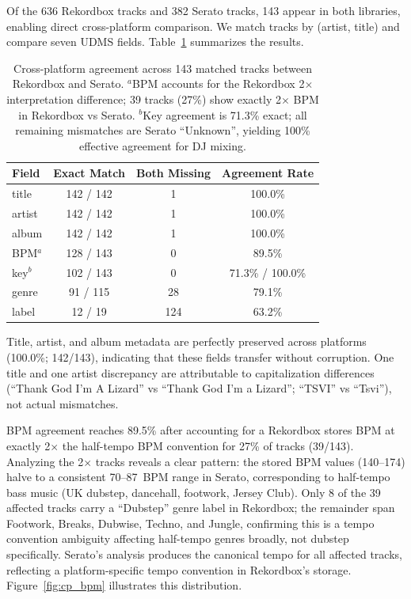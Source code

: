 \documentclass[letterpaper,10pt]{article}
\begin{document}
Of the 636 Rekordbox tracks and 382 Serato tracks, 143 appear in both libraries, enabling direct cross-platform comparison. We match tracks by (artist, title) and compare seven UDMS fields. Table~\ref{tab:cross-platform} summarizes the results.

\begin{table}[t]
  \centering
  \small
  \begin{tabular}{lccc}
    \toprule
    \textbf{Field} & \textbf{Exact Match} & \textbf{Both Missing} & \textbf{Agreement Rate} \\
    \midrule
    title        & 142 / 142 & 1  & 100.0\% \\
    artist       & 142 / 142 & 1  & 100.0\% \\
    album        & 142 / 142 & 1  & 100.0\% \\
    BPM$^a$      & 128 / 143 & 0  & 89.5\% \\
    key$^{b}$    & 102 / 143 & 0  & 71.3\% / 100.0\% \\
    genre        & 91 / 115  & 28 & 79.1\% \\
    label        & 12 / 19   & 124 & 63.2\% \\
    \bottomrule
  \end{tabular}
  \caption{Cross-platform agreement across 143 matched tracks between Rekordbox and Serato. $^{a}$BPM accounts for the Rekordbox 2$\times$ interpretation difference; 39 tracks (27\%) show exactly 2$\times$ BPM in Rekordbox vs Serato. $^{b}$Key agreement is 71.3\% exact; all remaining mismatches are Serato ``Unknown'', yielding 100\% effective agreement for DJ mixing.}
  \label{tab:cross-platform}
\end{table}

Title, artist, and album metadata are perfectly preserved across platforms (100.0\%; 142/143), indicating that these fields transfer without corruption. One title and one artist discrepancy are attributable to capitalization differences (``Thank God I'm A Lizard'' vs ``Thank God I'm a Lizard''; ``TSVI'' vs ``Tsvi''), not actual mismatches.

BPM agreement reaches 89.5\% after accounting for a Rekordbox stores BPM at exactly 2$\times$ the half-tempo BPM convention for 27\% of tracks (39/143). Analyzing the 2$\times$ tracks reveals a clear pattern: the stored BPM values (140--174) halve to a consistent 70--87~BPM range in Serato, corresponding to half-tempo bass music (UK dubstep, dancehall, footwork, Jersey Club). Only 8 of the 39 affected tracks carry a ``Dubstep'' genre label in Rekordbox; the remainder span Footwork, Breaks, Dubwise, Techno, and Jungle, confirming this is a tempo convention ambiguity affecting half-tempo genres broadly, not dubstep specifically. Serato's analysis produces the canonical tempo for all affected tracks, reflecting a platform-specific tempo convention in Rekordbox's storage. Figure~\ref{fig:cp_bpm} illustrates this distribution.
\end{document}
